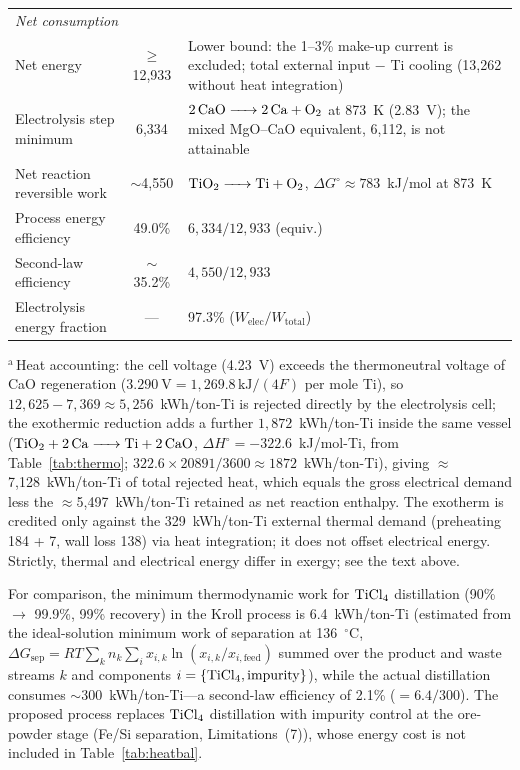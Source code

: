 \documentclass[pdflatex,sn-basic,Numbered]{sn-jnl}
\begin{document}
\begin{table}[!ht]
\begin{tabularx}{\linewidth}{l c X}
\midrule
\multicolumn{3}{l}{\textit{Net consumption}} \\
\quad Net energy & $\geq$12{,}933 & Lower bound: the 1--3\% make-up current is excluded; total external input $-$ Ti cooling (13{,}262 without heat integration) \\
\quad Electrolysis step minimum & 6{,}334 & $\ce{2CaO -> 2Ca + O2}$ at 873~K (2.83~V); the mixed MgO--CaO equivalent, 6{,}112, is not attainable \\
\quad Net reaction reversible work & $\sim$4{,}550 & $\ce{TiO2 -> Ti + O2}$, $\Delta G^{\circ}\approx783$~kJ/mol at 873~K \\
\quad Process energy efficiency & 49.0\% & $6{,}334/12{,}933$ (equiv.) \\
\quad Second-law efficiency & $\sim$35.2\% & $4{,}550/12{,}933$ \\
\quad Electrolysis energy fraction & --- & 97.3\% ($W_{\mathrm{elec}}/W_{\mathrm{total}}$) \\
\bottomrule
\end{tabularx}

\par\footnotesize $^{\mathrm{a}}$\,Heat accounting: the cell voltage (4.23~V) exceeds the thermoneutral voltage of CaO regeneration ($3.290~\mathrm{V} = 1{,}269.8\,\mathrm{kJ}/(4F)$ per mole Ti), so $12{,}625 - 7{,}369 \approx 5{,}256$~kWh/ton-Ti is rejected directly by the electrolysis cell; the exothermic reduction adds a further $1{,}872$~kWh/ton-Ti inside the same vessel ($\ce{TiO2 + 2Ca -> Ti + 2CaO}$, $\Delta H^{\circ} = -322.6$~kJ/mol-Ti, from Table~\ref{tab:thermo}; $322.6 \times 20891 / 3600 \approx 1872$~kWh/ton-Ti), giving $\approx$7{,}128~kWh/ton-Ti of total rejected heat, which equals the gross electrical demand less the $\approx$5{,}497~kWh/ton-Ti retained as net reaction enthalpy. The exotherm is credited only against the 329~kWh/ton-Ti external thermal demand (preheating 184 + 7, wall loss 138) via heat integration; it does not offset electrical energy. Strictly, thermal and electrical energy differ in exergy; see the text above.
\end{table}

For comparison, the minimum thermodynamic work for $\ce{TiCl4}$ distillation (90\% $\to$ 99.9\%, 99\% recovery) in the Kroll process is 6.4~kWh/ton-Ti (estimated from the ideal-solution minimum work of separation at 136~$^{\circ}$C, $\Delta G_{\mathrm{sep}} = RT \sum_k n_k \sum_i x_{i,k}\ln(x_{i,k}/x_{i,\mathrm{feed}})$ summed over the product and waste streams $k$ and components $i = \{\ce{TiCl4}, \mathrm{impurity}\}$), while the actual distillation consumes $\sim$300~kWh/ton-Ti---a second-law efficiency of 2.1\% ($= 6.4/300$). The proposed process replaces $\ce{TiCl4}$ distillation with impurity control at the ore-powder stage (Fe/Si separation, Limitations~(7)), whose energy cost is not included in Table~\ref{tab:heatbal}.
\end{document}
